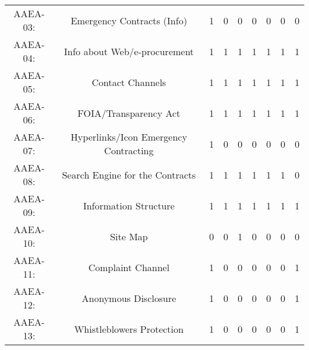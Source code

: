 \documentclass[a4paper, twoside]{report}
\begin{document}
\begin{table}[htbp]
\begin{adjustbox}{max width=\linewidth}
\begin{tabular}{rcccccccc}
    \multicolumn{1}{c}{AAEA-03:} & \multicolumn{1}{p{19em}}{\cellcolor[rgb]{ .749,  .749,  .749}Emergency Contracts (Info)} & \cellcolor[rgb]{ .749,  .749,  .749}1 & \cellcolor[rgb]{ .749,  .749,  .749}0 & \cellcolor[rgb]{ .749,  .749,  .749}0 & \cellcolor[rgb]{ .749,  .749,  .749}0 & \cellcolor[rgb]{ .749,  .749,  .749}0 & \cellcolor[rgb]{ .749,  .749,  .749}0 & \cellcolor[rgb]{ .749,  .749,  .749}0 \\
    \multicolumn{1}{c}{AAEA-04:} & \multicolumn{1}{p{19em}}{Info about Web/e-procurement} & 1     & 1     & 1     & 1     & 1     & 1     & 1 \\
    \multicolumn{1}{c}{AAEA-05:} & \multicolumn{1}{p{19em}}{Contact Channels} & 1     & 1     & 1     & 1     & 1     & 1     & 1 \\
    \multicolumn{1}{c}{AAEA-06:} & \multicolumn{1}{p{19em}}{FOIA/Transparency Act} & 1     & 1     & 1     & 1     & 1     & 1     & 1 \\
    \multicolumn{1}{c}{AAEA-07:} & \multicolumn{1}{p{19em}}{\cellcolor[rgb]{ .749,  .749,  .749}Hyperlinks/Icon Emergency Contracting} & \cellcolor[rgb]{ .749,  .749,  .749}1 & \cellcolor[rgb]{ .749,  .749,  .749}0 & \cellcolor[rgb]{ .749,  .749,  .749}0 & \cellcolor[rgb]{ .749,  .749,  .749}0 & \cellcolor[rgb]{ .749,  .749,  .749}0 & \cellcolor[rgb]{ .749,  .749,  .749}0 & \cellcolor[rgb]{ .749,  .749,  .749}0 \\
    \multicolumn{1}{c}{AAEA-08:} & \multicolumn{1}{p{19em}}{Search Engine for the Contracts} & 1     & 1     & 1     & 1     & 1     & 1     & 0 \\
    \multicolumn{1}{c}{AAEA-09:} & \multicolumn{1}{p{19em}}{Information Structure} & 1     & 1     & 1     & 1     & 1     & 1     & 1 \\
    \multicolumn{1}{c}{AAEA-10:} & \multicolumn{1}{p{19em}}{Site Map} & 0     & 0     & 1     & 0     & 0     & 0     & 0 \\
    \multicolumn{1}{c}{AAEA-11:} & \multicolumn{1}{p{19em}}{Complaint Channel} & 1     & 0     & 0     & 0     & 0     & 0     & 1 \\
    \multicolumn{1}{c}{AAEA-12:} & \multicolumn{1}{p{19em}}{\cellcolor[rgb]{ .749,  .749,  .749}Anonymous Disclosure} & \cellcolor[rgb]{ .749,  .749,  .749}1 & \cellcolor[rgb]{ .749,  .749,  .749}0 & \cellcolor[rgb]{ .749,  .749,  .749}0 & \cellcolor[rgb]{ .749,  .749,  .749}0 & \cellcolor[rgb]{ .749,  .749,  .749}0 & \cellcolor[rgb]{ .749,  .749,  .749}0 & \cellcolor[rgb]{ .749,  .749,  .749}1 \\
    \multicolumn{1}{c}{AAEA-13:} & \multicolumn{1}{p{19em}}{Whistleblowers Protection} & 1     & 0     & 0     & 0     & 0     & 0     & 1 \\

\end{tabular}
\end{adjustbox}
\end{table}
\end{document}
